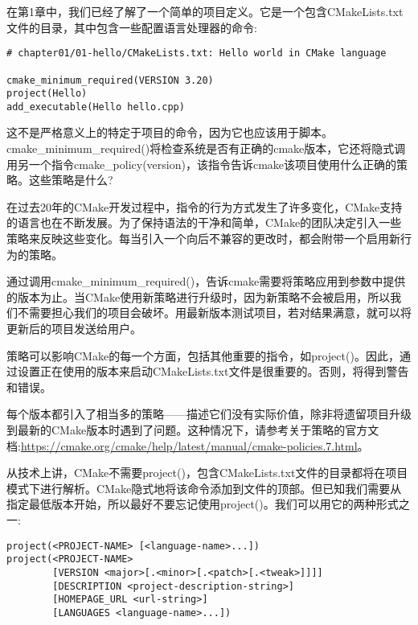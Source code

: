 
在第1章中，我们已经了解了一个简单的项目定义。它是一个包含CMakeLists.txt文件的目录，其中包含一些配置语言处理器的命令:

\begin{lstlisting}[style=styleCMake]
# chapter01/01-hello/CMakeLists.txt: Hello world in CMake language

cmake_minimum_required(VERSION 3.20)
project(Hello)
add_executable(Hello hello.cpp)
\end{lstlisting}


这不是严格意义上的特定于项目的命令，因为它也应该用于脚本。cmake\_minimum\_required()将检查系统是否有正确的cmake版本，它还将隐式调用另一个指令cmake\_policy(version)，该指令告诉cmake该项目使用什么正确的策略。这些策略是什么?

在过去20年的CMake开发过程中，指令的行为方式发生了许多变化，CMake支持的语言也在不断发展。为了保持语法的干净和简单，CMake的团队决定引入一些策略来反映这些变化。每当引入一个向后不兼容的更改时，都会附带一个启用新行为的策略。

通过调用cmake\_minimum\_required()，告诉cmake需要将策略应用到参数中提供的版本为止。当CMake使用新策略进行升级时，因为新策略不会被启用，所以我们不需要担心我们的项目会破坏。用最新版本测试项目，若对结果满意，就可以将更新后的项目发送给用户。

策略可以影响CMake的每一个方面，包括其他重要的指令，如project()。因此，通过设置正在使用的版本来启动CMakeLists.txt文件是很重要的。否则，将得到警告和错误。

每个版本都引入了相当多的策略——描述它们没有实际价值，除非将遗留项目升级到最新的CMake版本时遇到了问题。这种情况下，请参考关于策略的官方文档:\url{https://cmake.org/cmake/help/latest/manual/cmake-policies.7.html}。


从技术上讲，CMake不需要project()，包含CMakeLists.txt文件的目录都将在项目模式下进行解析。CMake隐式地将该命令添加到文件的顶部。但已知我们需要从指定最低版本开始，所以最好不要忘记使用project()。我们可以用它的两种形式之一:

\begin{lstlisting}[style=styleCMake]
project(<PROJECT-NAME> [<language-name>...])
project(<PROJECT-NAME>
		[VERSION <major>[.<minor>[.<patch>[.<tweak>]]]]
		[DESCRIPTION <project-description-string>]
		[HOMEPAGE_URL <url-string>]
		[LANGUAGES <language-name>...])
\end{lstlisting}

